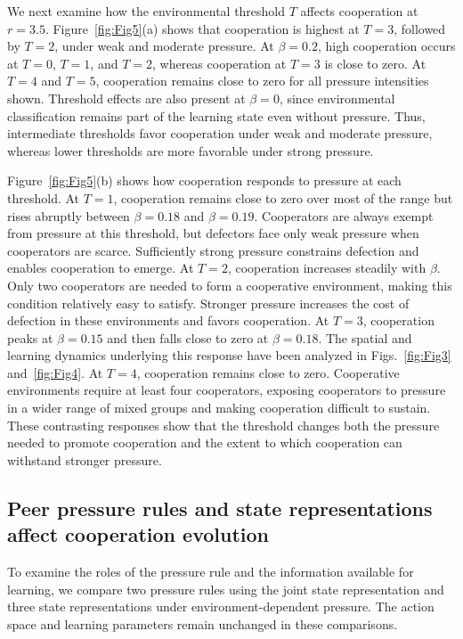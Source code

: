 \documentclass[%
  aip,
  amsmath,amssymb,
  reprint,
  showkeys,
]{revtex4-1}
\begin{document}
We next examine how the environmental threshold $T$ affects cooperation at $r=3.5$. Figure~\ref{fig:Fig5}(a) shows that cooperation is highest at $T=3$, followed by $T=2$, under weak and moderate pressure. At $\beta=0.2$, high cooperation occurs at $T=0$, $T=1$, and $T=2$, whereas cooperation at $T=3$ is close to zero. At $T=4$ and $T=5$, cooperation remains close to zero for all pressure intensities shown. Threshold effects are also present at $\beta=0$, since environmental classification remains part of the learning state even without pressure. Thus, intermediate thresholds favor cooperation under weak and moderate pressure, whereas lower thresholds are more favorable under strong pressure.

Figure~\ref{fig:Fig5}(b) shows how cooperation responds to pressure at each threshold. At $T=1$, cooperation remains close to zero over most of the range but rises abruptly between $\beta=0.18$ and $\beta=0.19$. Cooperators are always exempt from pressure at this threshold, but defectors face only weak pressure when cooperators are scarce. Sufficiently strong pressure constrains defection and enables cooperation to emerge. At $T=2$, cooperation increases steadily with $\beta$. Only two cooperators are needed to form a cooperative environment, making this condition relatively easy to satisfy. Stronger pressure increases the cost of defection in these environments and favors cooperation. At $T=3$, cooperation peaks at $\beta=0.15$ and then falls close to zero at $\beta=0.18$. The spatial and learning dynamics underlying this response have been analyzed in Figs.~\ref{fig:Fig3} and~\ref{fig:Fig4}. At $T=4$, cooperation remains close to zero. Cooperative environments require at least four cooperators, exposing cooperators to pressure in a wider range of mixed groups and making cooperation difficult to sustain. These contrasting responses show that the threshold changes both the pressure needed to promote cooperation and the extent to which cooperation can withstand stronger pressure.


\subsection{Peer pressure rules and state representations affect cooperation evolution}

To examine the roles of the pressure rule and the information available for learning, we compare two pressure rules using the joint state representation and three state representations under environment-dependent pressure. The action space and learning parameters remain unchanged in these comparisons.
\end{document}
